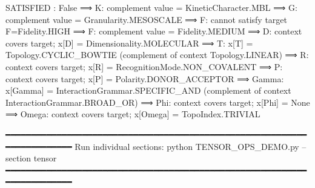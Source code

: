 \documentclass[12pt,a4paper]{article}
\begin{document}
SATISFIED : False
⟹    K: complement value = KineticCharacter.MBL
⟹    G: complement value = Granularity.MESOSCALE
⟹  F: cannot satisfy target F=Fidelity.HIGH
⟹    F: complement value = Fidelity.MEDIUM
⟹    D: context covers target; x{[}D{]} = Dimensionality.MOLECULAR
⟹    T: x{[}T{]} = Topology.CYCLIC\_BOWTIE (complement of context Topology.LINEAR)
⟹    R: context covers target; x{[}R{]} = RecognitionMode.NON\_COVALENT
⟹    P: context covers target; x{[}P{]} = Polarity.DONOR\_ACCEPTOR
⟹    Gamma: x{[}Gamma{]} = InteractionGrammar.SPECIFIC\_AND (complement of context InteractionGrammar.BROAD\_OR)
⟹    Phi: context covers target; x{[}Phi{]} = None
⟹    Omega: context covers target; x{[}Omega{]} = TopoIndex.TRIVIAL

━━━━━━━━━━━━━━━━━━━━━━━━━━━━━━━━━━━━━━━━━━━━━━━━━━━━━━━━━━━━━━━━━━━━━━━━
Run individual sections:  python TENSOR\_OPS\_DEMO.py --section tensor
━━━━━━━━━━━━━━━━━━━━━━━━━━━━━━━━━━━━━━━━━━━━━━━━━━━━━━━━━━━━━━━━━━━━━━━━
\end{document}
